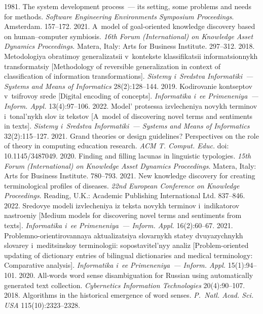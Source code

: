 \begin{multicols}{2}
{{\begin{thebibliography}{99}
 1981. The system development process~--- its setting, 
some problems and needs for methods. \textit{Software Engineering Environments Symposium 
Proceedings}. Amsterdam. 157--172.
 2021. A~model of goal-oriented knowledge discovery based on human--computer 
symbiosis. \textit{16th Forum (International) on Knowledge Asset Dynamics Proceedings.} Matera, 
Italy: Arts for Business Institute. 297--312.
 2018. Metodologiya obratimoy generalizatsii v~kontekste klassifikatsii 
informatsionnykh trans\-for\-ma\-tsiy [Methodology of reversible generalization in context of classification of 
information transformations]. \textit{Sistemy i~Sredstva Informatiki~--- Systems and Means of 
Informatics} 28(2):128--144.
 2019. Kodirovanie kontseptov v~tsifrovoy srede [Digital encoding of concepts]. 
\textit{Informatika i~ee Primeneniya~--- Inform. Appl.} 13(4):97--106.
 2022. Model' protsessa izvlecheniya novykh terminov i~tonal'nykh slov iz tekstov 
[A~model of discovering novel terms and sentiments in texts]. \textit{Sistemy i~Sredstva Informatiki~--- 
Systems and Means of Informatics} 32(2):115--127.
 2021. Grand theories or design guidelines? Perspectives on the role of 
theory in computing education research. \textit{ACM T. Comput. Educ.} 
doi: 10.1145/3487049.
 2020. Finding and filling lacunas in linguistic typologies. \textit{15th Forum 
(International) on Knowledge Asset Dynamics Proceedings}. Matera, Italy: Arts for Business Institute. 
780--793.
 2021. New knowledge discovery for creating terminological 
profiles of diseases. \textit{22nd European Conference on Knowledge Proceedings}. Reading, U.K.: 
Academic Publishing International Ltd. 837--846.
 2022. Sredovye modeli izvlecheniya iz teksta 
novykh terminov i~indikatorov nastroeniy [Medium models for discovering novel terms and sentiments 
from texts]. \textit{Informatika i~ee Primeneniya~--- Inform. Appl.} 16(2):60--67.
 2021. Problemno-orientirovannaya ak\-tu\-a\-li\-za\-tsiya slovarnykh statey dvuyazychnykh 
slovarey i~me\-ditsinskoy terminologii: so\-po\-sta\-vi\-tel'\-nyy ana\-liz [Problem-oriented updating of dictionary 
entries of bilingual \mbox{dictionaries} and medical terminology: Comparative analysis]. \textit{Informatika i~ee 
Primeneniya~--- Inform. Appl.} 15(1):94--101.
 2020. All-words word sense disambiguation for Russian 
using automatically generated text collection. \textit{Cybernetics Information Technologies} 
20(4):90--107.
 2018. Algorithms in the historical 
emergence of word senses. \textit{P.~Natl. Acad. Sci. USA} 
 115(10):2323--2328.
 

\end{thebibliography}}}
\end{multicols}
